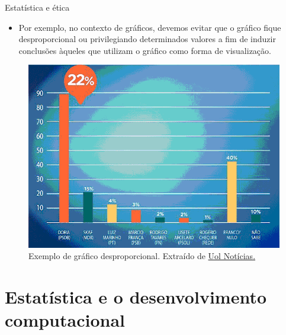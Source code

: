 \documentclass[
  ignorenonframetext,
  serif,
  professionalfont,
  usenames,
  dvipsnames,
  aspectratio = 169]{beamer}
\providecommand{\tightlist}{%
  \setlength{\itemsep}{0pt}\setlength{\parskip}{0pt}}
\renewcommand{\tightlist}{%
  \setlength{\itemsep}{0\baselineskip}
  \setlength{\parskip}{0.25\baselineskip}
}
\def\beginAThirdColumn{\begin{minipage}{0.31\textwidth}}%
\def\beginTwoThirdsColumn{\begin{minipage}{0.64\textwidth}}%
\def\endColumns{\end{minipage}}%
\begin{document}
\begin{frame}{Estatística e ética}
\label{estatuxedstica-e-uxe9tica-2}
\beginAThirdColumn

\begin{itemize}
\tightlist
\item
  Por exemplo, no contexto de gráficos, devemos evitar que o gráfico
  fique desproporcional ou privilegiando determinados valores a fim de
  induzir conclusões àqueles que utilizam o gráfico como forma de
  visualização.
\end{itemize}

\endColumns
\beginTwoThirdsColumn

\begin{figure}

{\centering \includegraphics[width=1.1\linewidth]{./img/grafico-desproporcional} 

}

\caption{Exemplo de gráfico desproporcional. Extraído de \href{https://noticias.uol.com.br/politica/eleicoes/2018/noticias/2018/05/30/psdb-sp-divulga-grafico-desproporcional-de-doria-e-tira-do-ar-apos-criticas.htm}{Uol Notícias.}}\label{fig:unnamed-chunk-9}
\end{figure}

\endColumns
\end{frame}

\section{Estatística e o desenvolvimento
computacional}\label{estatuxedstica-e-o-desenvolvimento-computacional}
\end{document}
